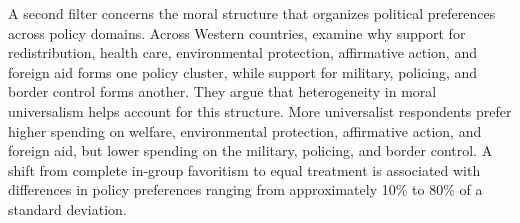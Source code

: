 \documentclass[11pt,a4paper]{article}
\begin{document}
A second filter concerns the moral structure that organizes political preferences across policy domains. Across Western countries, \citet{enke_moral_2023} examine why support for redistribution, health care, environmental protection, affirmative action, and foreign aid forms one policy cluster, while support for military, policing, and border control forms another. They argue that heterogeneity in moral universalism helps account for this structure. More universalist respondents prefer higher spending on welfare, environmental protection, affirmative action, and foreign aid, but lower spending on the military, policing, and border control. %
A shift from complete in-group favoritism to equal treatment is associated with differences in policy preferences ranging from approximately 10\% to 80\% of a standard deviation.
\end{document}
